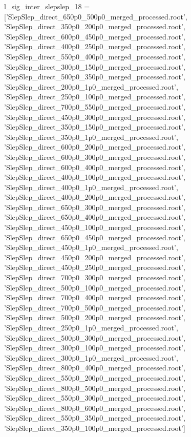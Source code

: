 l_sig_inter_slepslep_18 = ['SlepSlep_direct_650p0_500p0_merged_processed.root',
                        'SlepSlep_direct_350p0_200p0_merged_processed.root',
                        'SlepSlep_direct_600p0_450p0_merged_processed.root',
                        'SlepSlep_direct_400p0_250p0_merged_processed.root',
                        'SlepSlep_direct_550p0_400p0_merged_processed.root',
                        'SlepSlep_direct_300p0_150p0_merged_processed.root',
                        'SlepSlep_direct_500p0_350p0_merged_processed.root',
                        'SlepSlep_direct_200p0_1p0_merged_processed.root',
                        'SlepSlep_direct_250p0_100p0_merged_processed.root',
                        'SlepSlep_direct_700p0_550p0_merged_processed.root',
                        'SlepSlep_direct_450p0_300p0_merged_processed.root',
                        'SlepSlep_direct_350p0_150p0_merged_processed.root',
                        'SlepSlep_direct_350p0_1p0_merged_processed.root',
                        'SlepSlep_direct_600p0_200p0_merged_processed.root',
                        'SlepSlep_direct_600p0_300p0_merged_processed.root',
                        'SlepSlep_direct_600p0_400p0_merged_processed.root',
                        'SlepSlep_direct_400p0_100p0_merged_processed.root',
                        'SlepSlep_direct_400p0_1p0_merged_processed.root',
                        'SlepSlep_direct_400p0_200p0_merged_processed.root',
                        'SlepSlep_direct_650p0_300p0_merged_processed.root',
                        'SlepSlep_direct_650p0_400p0_merged_processed.root',
                        'SlepSlep_direct_450p0_100p0_merged_processed.root',
                        'SlepSlep_direct_650p0_450p0_merged_processed.root',
                        'SlepSlep_direct_450p0_1p0_merged_processed.root',
                        'SlepSlep_direct_450p0_200p0_merged_processed.root',
                        'SlepSlep_direct_450p0_250p0_merged_processed.root',
                        'SlepSlep_direct_700p0_300p0_merged_processed.root',
                        'SlepSlep_direct_500p0_100p0_merged_processed.root',
                        'SlepSlep_direct_700p0_400p0_merged_processed.root',
                        'SlepSlep_direct_700p0_500p0_merged_processed.root',
                        'SlepSlep_direct_500p0_200p0_merged_processed.root',
                        'SlepSlep_direct_250p0_1p0_merged_processed.root',
                        'SlepSlep_direct_500p0_300p0_merged_processed.root',
                        'SlepSlep_direct_300p0_100p0_merged_processed.root',
                        'SlepSlep_direct_300p0_1p0_merged_processed.root',
                        'SlepSlep_direct_800p0_400p0_merged_processed.root',
                        'SlepSlep_direct_550p0_200p0_merged_processed.root',
                        'SlepSlep_direct_800p0_500p0_merged_processed.root',
                        'SlepSlep_direct_550p0_300p0_merged_processed.root',
                        'SlepSlep_direct_800p0_600p0_merged_processed.root',
                        'SlepSlep_direct_550p0_350p0_merged_processed.root',
                        'SlepSlep_direct_350p0_100p0_merged_processed.root']





